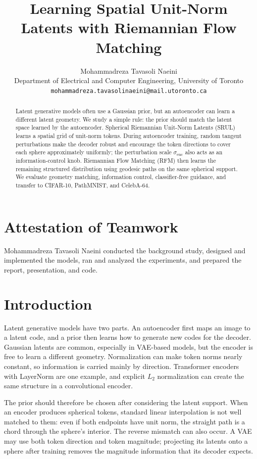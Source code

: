 \documentclass{article}
\title{Learning Spatial Unit-Norm Latents with Riemannian Flow Matching}
\author{Mohammadreza Tavasoli Naeini \\
Department of Electrical and Computer Engineering, University of Toronto \\
\texttt{mohammadreza.tavasolinaeini@mail.utoronto.ca}}
\begin{document}
\maketitle

\begin{abstract}
Latent generative models often use a Gaussian prior, but an autoencoder can learn a different latent geometry. We study a simple rule: the prior should match the latent space learned by the autoencoder. Spherical Riemannian Unit-Norm Latents (SRUL) learns a spatial grid of unit-norm tokens. During autoencoder training, random tangent perturbations make the decoder robust and encourage the token directions to cover each sphere approximately uniformly; the perturbation scale $\sigma_{\mathrm{enc}}$ also acts as an information-control knob. Riemannian Flow Matching (RFM) then learns the remaining structured distribution using geodesic paths on the same spherical support. We evaluate geometry matching, information control, classifier-free guidance, and transfer to CIFAR-10, PathMNIST, and CelebA-64.
\end{abstract}

\section*{Attestation of Teamwork}
Mohammadreza Tavasoli Naeini conducted the background study, designed and implemented the models, ran and analyzed the experiments, and prepared the report, presentation, and code.

\section{Introduction}
Latent generative models have two parts. An autoencoder first maps an image to a latent code, and a prior then learns how to generate new codes for the decoder. Gaussian latents are common, especially in VAE-based models, but the encoder is free to learn a different geometry. Normalization can make token norms nearly constant, so information is carried mainly by direction. Transformer encoders with LayerNorm are one example, and explicit $L_2$ normalization can create the same structure in a convolutional encoder.

The prior should therefore be chosen after considering the latent support. When an encoder produces spherical tokens, standard linear interpolation is not well matched to them: even if both endpoints have unit norm, the straight path is a chord through the sphere's interior. The reverse mismatch can also occur. A VAE may use both token direction and token magnitude; projecting its latents onto a sphere after training removes the magnitude information that its decoder expects.
\end{document}
